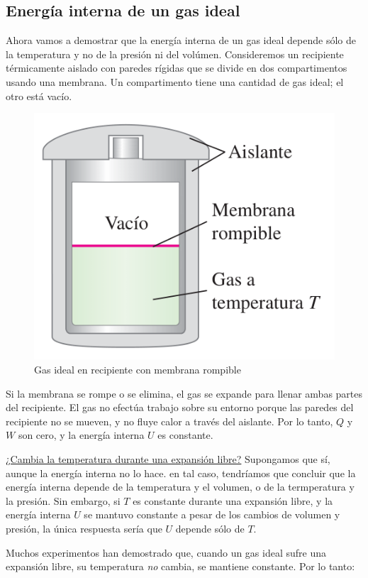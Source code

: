 \documentclass[12pt]{article}
\begin{document}
  \subsection{Energía interna de un gas ideal}
  Ahora vamos a demostrar que la energía interna de un gas ideal depende sólo de la temperatura y no de la presión ni del volúmen. Consideremos un recipiente térmicamente aislado con paredes rígidas que se divide en dos compartimentos usando una membrana. Un compartimento tiene una cantidad de gas ideal; el otro está vacío. 

  \begin{figure}[H]
    \centering
    \includegraphics[width=0.5\linewidth]{imagenes/expansion-libre-gas-ideal.png}
    \caption{Gas ideal en recipiente con membrana rompible}
    \label{fig:e-int-gas-ideal}
  \end{figure}
  
  Si la membrana se rompe o se elimina, el gas se expande para llenar ambas partes del recipiente. El gas no efectúa trabajo sobre su entorno porque las paredes del recipiente no se mueven, y no fluye calor a través del aislante. Por lo tanto, $ Q $ y $ W $ son cero, y la energía interna $ U $ es constante.

  \underline{¿Cambia la temperatura durante una expansión libre?} Supongamos que sí, aunque la energía interna no lo hace. en tal caso, tendríamos que concluir que la energía interna depende de la temperatura y el volumen, o de la termperatura y la presión. Sin embargo, si $ T $ es constante durante una expansión libre, y la energía interna $ U $ se mantuvo constante a pesar de los cambios de volumen y presión, la única respuesta sería que $ U $ depende sólo de $ T $. 

  Muchos experimentos han demostrado que, cuando un gas ideal sufre una expansión libre, su temperatura \textit{no} cambia, se mantiene constante. Por lo tanto:

  \vspace{0.2cm}
\end{document}
